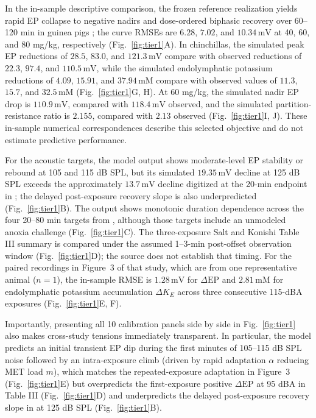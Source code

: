\documentclass[final,5p,times]{elsarticle}
\begin{document}
In the in-sample descriptive comparison, the frozen reference realization yields rapid EP collapse to negative nadirs and dose-ordered biphasic recovery over 60--120 min in guinea pigs \citep{PikeBosher1980}; the curve RMSEs are \(6.28\), \(7.02\), and \(10.34\,\mathrm{mV}\) at 40, 60, and 80 mg/kg, respectively (Fig.~\ref{fig:tier1}A). In chinchillas, the simulated peak EP reductions of \(28.5\), \(83.0\), and \(121.3\,\mathrm{mV}\) compare with observed reductions of \(22.3\), \(97.4\), and \(110.5\,\mathrm{mV}\), while the simulated endolymphatic potassium reductions of \(4.09\), \(15.91\), and \(37.94\,\mathrm{mM}\) compare with observed values of \(11.3\), \(15.7\), and \(32.5\,\mathrm{mM}\) \citep{RybakMorizono1982} (Fig.~\ref{fig:tier1}G, H). At 60 mg/kg, the simulated nadir EP drop is \(110.9\,\mathrm{mV}\), compared with \(118.4\,\mathrm{mV}\) observed, and the simulated partition-resistance ratio is \(2.155\), compared with \(2.13\) observed \citep{AsakumaSnow1980} (Fig.~\ref{fig:tier1}I, J). These in-sample numerical correspondences describe this selected objective and do not estimate predictive performance.

For the acoustic targets, the model output shows moderate-level EP stability or rebound at 105 and 115 dB SPL, but its simulated \(19.35\,\mathrm{mV}\) decline at 125 dB SPL exceeds the approximately \(13.7\,\mathrm{mV}\) decline digitized at the 20-min endpoint in \citet{Wang1992}; the delayed post-exposure recovery slope is also underpredicted (Fig.~\ref{fig:tier1}B). The output shows monotonic duration dependence across the four 20--80 min targets from \citet{Wang1990}, although those targets include an unmodeled anoxia challenge (Fig.~\ref{fig:tier1}C). The three-exposure Salt and Konishi Table III summary is compared under the assumed 1--3-min post-offset observation window (Fig.~\ref{fig:tier1}D); the source does not establish that timing. For the paired recordings in Figure~3 of that study, which are from one representative animal (\(n=1\)), the in-sample RMSE is \(1.28\,\mathrm{mV}\) for \(\Delta\mathrm{EP}\) and \(2.81\,\mathrm{mM}\) for endolymphatic potassium accumulation \(\Delta K_E\) across three consecutive 115-dBA exposures (Fig.~\ref{fig:tier1}E, F).

Importantly, presenting all 10 calibration panels side by side in Fig.~\ref{fig:tier1} also makes cross-study tensions immediately transparent. In particular, the model predicts an initial transient EP dip during the first minutes of 105--115 dB SPL noise followed by an intra-exposure climb (driven by rapid adaptation \(\alpha\) reducing MET load \(m\)), which matches the repeated-exposure adaptation in \citet{SaltKonishi1979} Figure~3 (Fig.~\ref{fig:tier1}E) but overpredicts the first-exposure positive \(\Delta\mathrm{EP}\) at 95 dBA in \citet{SaltKonishi1979} Table III (Fig.~\ref{fig:tier1}D) and underpredicts the delayed post-exposure recovery slope in \citet{Wang1992} at 125 dB SPL (Fig.~\ref{fig:tier1}B).
\end{document}
